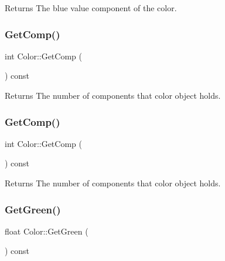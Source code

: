 \begin{DoxyReturn}{Returns}
The blue value component of the color. 
\end{DoxyReturn}
\mbox{\label{classColor_ae63e798d250d1b1393008e019a054253}} 
\subsubsection{\texorpdfstring{Get\+Comp()}{GetComp()}\hspace{0.1cm}{\footnotesize\ttfamily [1/2]}}
{\footnotesize\ttfamily int Color\+::\+Get\+Comp (\begin{DoxyParamCaption}{ }\end{DoxyParamCaption}) const\hspace{0.3cm}{\ttfamily [inline]}}

\begin{DoxyReturn}{Returns}
The number of components that color object holds. 
\end{DoxyReturn}
\mbox{\label{classColor_ae63e798d250d1b1393008e019a054253}} 
\subsubsection{\texorpdfstring{Get\+Comp()}{GetComp()}\hspace{0.1cm}{\footnotesize\ttfamily [2/2]}}
{\footnotesize\ttfamily int Color\+::\+Get\+Comp (\begin{DoxyParamCaption}{ }\end{DoxyParamCaption}) const\hspace{0.3cm}{\ttfamily [inline]}}

\begin{DoxyReturn}{Returns}
The number of components that color object holds. 
\end{DoxyReturn}
\mbox{\label{classColor_a0c1d09e2435aefad98931d765bc36d01}} 
\subsubsection{\texorpdfstring{Get\+Green()}{GetGreen()}\hspace{0.1cm}{\footnotesize\ttfamily [1/2]}}
{\footnotesize\ttfamily float Color\+::\+Get\+Green (\begin{DoxyParamCaption}{ }\end{DoxyParamCaption}) const\hspace{0.3cm}{\ttfamily [inline]}}

